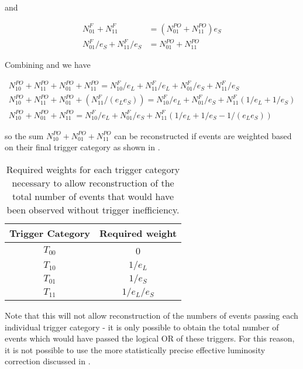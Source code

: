 \noindent and

\begin{equation}
\begin{split}
  N^{F}_{01} + N^{F}_{11} &= ( N^{PO}_{01} + N^{PO}_{11} ) e_S \\
  N^{F}_{01} / e_S + N^{F}_{11} / e_S &= N^{PO}_{01} + N^{PO}_{11}
  \label{eq:appendix:subleading_only}
\end{split}
\end{equation}

\noindent Combining  and 
we have

\begin{gather}
  \label{eq:appendix:final_PO_connection}
  N^{PO}_{10} + N^{PO}_{11} + N^{PO}_{01} + N^{PO}_{11} = N^{F}_{10} / e_L + N^{F}_{11} / e_L + N^{F}_{01} / e_S + N^{F}_{11} / e_S \\
  N^{PO}_{10} + N^{PO}_{11} + N^{PO}_{01} + (N^{F}_{11}/(e_L e_S)) = N^{F}_{10} / e_L + N^{F}_{01} / e_S + N^{F}_{11} ( 1 / e_L + 1 / e_S ) \\
  N^{PO}_{10} + N^{PO}_{01} + N^{PO}_{11}  = N^{F}_{10} / e_L + N^{F}_{01} / e_S + N^{F}_{11} ( 1 / e_L + 1 / e_S - 1/(e_L e_S) )
\end{gather}

\noindent so the sum $N^{PO}_{10} + N^{PO}_{01} + N^{PO}_{11}$ can be reconstructed
if events are weighted based on their final trigger category as shown in .

\begin{table}
\begin{center}
  \begin{tabular}{ c c }
    Trigger Category & Required weight \\
    \midrule
    $T_{00}$         & 0               \\
    $T_{10}$         & $1/e_L$         \\ 
    $T_{01}$         & $1/e_S$         \\
    $T_{11}$         & $1/e_L/e_S$     \\       
  \end{tabular}
  \caption{Required weights for each trigger category necessary to allow reconstruction
           of the total number of events that would have been observed without trigger
           inefficiency.}
  \label{tab:appendix:trig_weights}
\end{center}
\end{table}

Note that this will not allow reconstruction of the numbers of events
passing each individual trigger category - it is only possible to obtain the total
number of events which would have passed the logical OR of these triggers. For this
reason, it is not possible to use the more statistically precise effective luminosity
correction discussed in .
